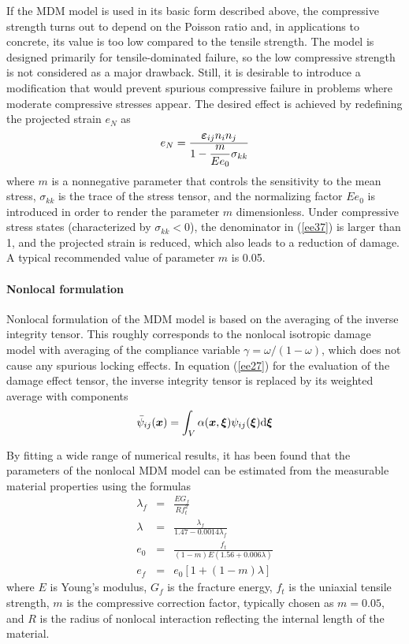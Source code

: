 \documentclass[epsf,a4paper]{article}
\newcommand{\mbf}[1]{\mbox{\boldmath$#1$}}
\newcommand {\eps} {\mbf{\varepsilon}}
\newcommand{\vxi}{\mbf{\xi}}             %
\newcommand{\vx}{\mbf{x}}             %
\begin{document}
If the MDM model is used in its basic form described above, 
the compressive strength turns out to depend on the Poisson ratio and,
in applications to concrete, its value is too low compared to the
tensile strength. The model is designed primarily for tensile-dominated
failure, so the low compressive strength 
is not considered as a major drawback. Still, it
is desirable to introduce a modification that would prevent spurious
compressive failure in problems where moderate compressive stresses
appear. The desired effect is achieved by redefining the projected
strain $e_N$ as
\begin{equation}
\label{ee37}
e_N =  \frac{\eps_{ij}n_in_j}{1-\displaystyle\frac{m}{Ee_0}\sigma_{kk}}
\end{equation}
where $m$ is a nonnegative parameter that controls the sensitivity to the
mean stress, $\sigma_{kk}$ is the trace of the stress tensor,
and the normalizing factor 
$Ee_0$ is introduced in order to render the parameter
$m$ dimensionless. 
Under compressive stress states (characterized by $\sigma_{kk}<0$), 
the denominator in (\ref{ee37}) is larger than 1, and the projected strain
is reduced, which also leads to a reduction of damage. 
A typical recommended value of parameter $m$ is 0.05. 

\paragraph{Nonlocal formulation}

Nonlocal formulation of the MDM model is based on the averaging of
the inverse integrity tensor. This roughly corresponds to the nonlocal
isotropic damage model with averaging of the compliance variable 
$\gamma=\omega/(1-\omega)$, which does not cause any spurious locking effects.
In equation (\ref{ee27}) for the evaluation of the damage effect tensor,
the inverse integrity tensor is replaced by its weighted average with
components
\begin{equation}
\label{psinl1}
\bar{\psi}_{ij}(\vx)=\int_V \alpha(\vx,\vxi)\psi_{ij}(\vxi)\mbox{d}\vxi
\end{equation}

By fitting a wide range of numerical results, it has been found that
the parameters of the nonlocal MDM model can be estimated from the
measurable material properties using the formulas
\begin{eqnarray}
\lambda_f&=&\frac{EG_f}{Rf_t^2}
\\
\lambda&=&\frac{\lambda_f}{1.47-0.0014\lambda_f}
\\
e_0&=&\frac{f_t}{(1-m)E(1.56+0.006\lambda)}
\\
e_f&=&e_0[1+(1-m)\lambda]
\end{eqnarray}
where $E$ is Young's modulus, $G_f$ is the fracture energy, $f_t$
is the uniaxial tensile strength, 
$m$ is the compressive correction factor, typically chosen
as $m=0.05$, and $R$ is the radius of nonlocal interaction reflecting the
internal length of the material.
\end{document}
